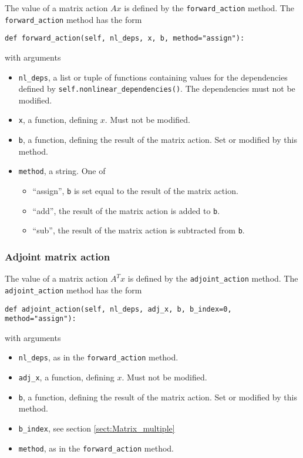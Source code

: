 \documentclass[11pt]{article}
\begin{document}
The value of a matrix action $A x$ is defined by the \texttt{forward\_action}
method. The \texttt{forward\_action} method has the form
\begin{lstlisting}
def forward_action(self, nl_deps, x, b, method="assign"):
\end{lstlisting}
with arguments
\begin{itemize}
  \item \texttt{nl\_deps}, a list or tuple of functions containing values for
    the dependencies defined by \texttt{self.nonlinear\_dependencies()}. The
    dependencies must not be modified.
  \item \texttt{x}, a function, defining $x$. Must not be modified.
  \item \texttt{b}, a function, defining the result of the matrix action. Set
    or modified by this method.
  \item \texttt{method}, a string. One of
  \begin{itemize}
    \item ``assign'', \texttt{b} is set equal to the result of the matrix
      action.
    \item ``add'', the result of the matrix action is added to \texttt{b}.
    \item ``sub'', the result of the matrix action is subtracted from
      \texttt{b}.
  \end{itemize}
\end{itemize}

\subsubsection{Adjoint matrix action}

The value of a matrix action $A^T x$ is defined by the \texttt{adjoint\_action}
method. The \texttt{adjoint\_action} method has the form
\begin{lstlisting}
def adjoint_action(self, nl_deps, adj_x, b, b_index=0, method="assign"):
\end{lstlisting}
with arguments
\begin{itemize}
  \item \texttt{nl\_deps}, as in the \texttt{forward\_action} method.
  \item \texttt{adj\_x}, a function, defining $x$. Must not be modified.
  \item \texttt{b}, a function, defining the result of the matrix action. Set
    or modified by this method.
  \item \texttt{b\_index}, see section \ref{sect:Matrix_multiple}
  \item \texttt{method}, as in the \texttt{forward\_action} method.
\end{itemize}
\end{document}
